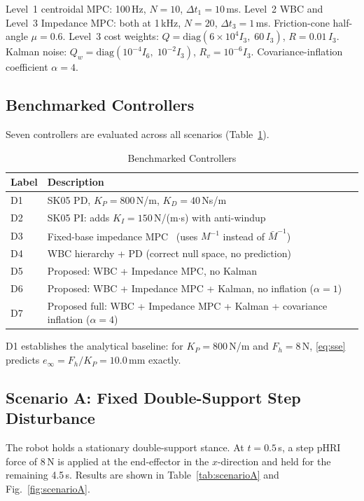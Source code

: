 \documentclass[journal]{IEEEtran}
\newcommand{\Mbar}{\bar{M}^{-1}}
\begin{document}
Level~1 centroidal MPC: 100\,Hz, $N=10$, $\Delta t_1=10$\,ms.
Level~2 WBC and Level~3 Impedance MPC: both at 1\,kHz, $N=20$,
$\Delta t_3=1$\,ms.
Friction-cone half-angle $\mu=0.6$.
Level~3 cost weights: $Q=\mathrm{diag}(6\times10^4 I_3,\;60\,I_3)$,
$R=0.01\,I_3$.
Kalman noise: $Q_w=\mathrm{diag}(10^{-4}I_6,\;10^{-2}I_3)$,
$R_v=10^{-6}I_3$.
Covariance-inflation coefficient $\alpha=4$.

\subsection{Benchmarked Controllers}

Seven controllers are evaluated across all scenarios (Table~\ref{tab:controllers}).

\begin{table}[!t]
\caption{Benchmarked Controllers}
\label{tab:controllers}
\renewcommand{\arraystretch}{1.2}
\begin{tabular}{lp{6cm}}
\toprule
\textbf{Label} & \textbf{Description} \\
\midrule
D1 & SK05 PD, $K_P=800$\,N/m, $K_D=40$\,Ns/m \\
D2 & SK05 PI: adds $K_I=150$\,N/(m$\cdot$s) with anti-windup \\
D3 & Fixed-base impedance MPC~\cite{cao2026impedance} (uses $M^{-1}$ instead of $\Mbar$) \\
D4 & WBC hierarchy + PD (correct null space, no prediction) \\
D5 & Proposed: WBC + Impedance MPC, no Kalman \\
D6 & Proposed: WBC + Impedance MPC + Kalman, no inflation ($\alpha=1$) \\
D7 & Proposed full: WBC + Impedance MPC + Kalman + covariance inflation ($\alpha=4$) \\
\bottomrule
\end{tabular}
\end{table}

D1 establishes the analytical baseline: for $K_P=800$\,N/m and
$F_h=8$\,N, \eqref{eq:sse} predicts $e_\infty=F_h/K_P=10.0$\,mm exactly.

\subsection{Scenario A: Fixed Double-Support Step Disturbance}

The robot holds a stationary double-support stance.
At $t=0.5$\,s, a step pHRI force of 8\,N is applied at the end-effector in
the $x$-direction and held for the remaining 4.5\,s.
Results are shown in Table~\ref{tab:scenarioA} and Fig.~\ref{fig:scenarioA}.
\end{document}
